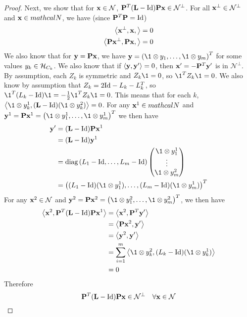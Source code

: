 \begin{proof}
Next, we show that for $\mathbf{x} \in \mathcal{N}$, $\mathbf{P}^T(\mathbf{L}-\mathrm{Id})\mathbf{P}\mathbf{x} \in \mathcal{N}^\perp$.
For all $\mathbf{x}^\perp \in \mathcal{N}^\perp$ and $\mathbf{x} \in mathcal{N}$, we have (since $\mathbf{P}^T \mathbf{P} = \mathrm{Id}$)
\begin{align}
    \left\langle \mathbf{x}^\perp, \mathbf{x}, \right\rangle &= 0 \\
    \left\langle \mathbf{P}\mathbf{x}^\perp, \mathbf{P}\mathbf{x}, \right\rangle &= 0 
\end{align}
We also know that for $\mathbf{y} = \mathbf{P}\mathbf{x}$, we have $\v{y} = \left(\1 \otimes y_1, \dots, \1 \otimes y_m\right)^T$ for some values $y_k \in \mathcal{H}_{C_k}$.
We also know that if $\left\langle \mathbf{y}, \mathbf{y}'\right\rangle = 0$, then $\mathbf{x}' = -\mathbf{P}^T \mathbf{y}'$ is in $\mathcal{N}^\perp$.
By assumption, each $Z_k$ is symmetric and $Z_k\1=0$, so $\1^T Z_k \1 = 0$.
We also know by assumption that $Z_k = 2\mathrm{Id} - L_k - L_k^T$, so $\1^T (L_k - \I)\1 = -\frac{1}{2}\1^T Z_k \1 = 0$.
This means that for each $k$, $\left\langle \1 \otimes y^1_k, (\v{L} - \I)(\1 \otimes y^2_k)\right\rangle = 0$.
For any $\mathbf{x}^1 \in mathcal{N}$ and $\v{y}^1 = \v{P}\v{x}^1 = \left(\1 \otimes y_1^1, \dots, \1 \otimes y_m^1\right)^T$ we then have 
\begin{align}
\v{y}' &= (\v{L} - \I)\v{P}\v{x}^1 \\ 
&= (\v{L} - \I)\v{y}^1 \\ 
&= \diag\left(L_1 - \I, \dots, L_m - \I\right) \begin{pmatrix}
    \1 \otimes y_1^1 \\
    \vdots \\
    \1 \otimes y_m^2
\end{pmatrix} \\ 
&= \left((L_1 - \I)(\1 \otimes y_1^1), \dots, (L_m -\I)(\1 \otimes y_m^1)\right)^T
\end{align}
For any $\mathbf{x}^2 \in \mathcal{N}$ and $\v{y}^2 = \v{P}\v{x}^2 = \left(\1 \otimes y_1^2, \dots, \1 \otimes y_m^2\right)^T$, we then have
\begin{align}    
    \left\langle \v{x}^2, \v{P}^T (\v{L} - \I)\v{P}\v{x}^1 \right\rangle &= \left\langle \v{x}^2, \v{P}^T \v{y}' \right\rangle \\
    &= \left\langle \v{P}\v{x}^2, \v{y}' \right\rangle \\
    &= \left\langle \v{y}^2, \v{y}' \right\rangle \\
    &= \sum_{i=1}^m \left\langle \1 \otimes y_k^2, (L_k - \I)(\1 \otimes y_k^1) \right\rangle \\
    &= 0
\end{align}
Therefore 
\begin{equation}\label{LIx_in_NT}
\mathbf{P}^T(\mathbf{L}-\mathrm{Id})\mathbf{P}\mathbf{x} \in \mathcal{N}^\perp \quad \forall \mathbf{x} \in \mathcal{N}
\end{equation}


\end{proof}